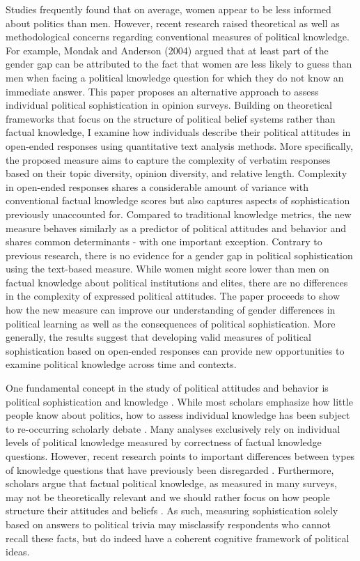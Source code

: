 \documentclass[12pt]{article}
\begin{document}
Studies frequently found that on average, women appear to be less informed about politics than men. However, recent research raised theoretical as well as methodological concerns regarding conventional measures of political knowledge. For example, Mondak and Anderson (2004) argued that at least part of the gender gap can be attributed to the fact that women are less likely to guess than men when facing a political knowledge question for which they do not know an immediate answer. This paper proposes an alternative approach to assess individual political sophistication in opinion surveys. Building on theoretical frameworks that focus on the structure of political belief systems rather than factual knowledge, I examine how individuals describe their political attitudes in open-ended responses using quantitative text analysis methods. More specifically, the proposed measure aims to capture the complexity of verbatim responses based on their topic diversity, opinion diversity, and relative length. Complexity in open-ended responses shares a considerable amount of variance with conventional factual knowledge scores but also captures aspects of sophistication previously unaccounted for. Compared to traditional knowledge metrics, the new measure behaves similarly as a predictor of political attitudes and behavior and shares common determinants - with one important exception. Contrary to previous research, there is no evidence for a gender gap in political sophistication using the text-based measure. While women might score lower than men on factual knowledge about political institutions and elites, there are no differences in the complexity of expressed political attitudes. The paper proceeds to show how the new measure can improve our understanding of gender differences in political learning as well as the consequences of political sophistication. More generally, the results suggest that developing valid measures of political sophistication based on open-ended responses can provide new opportunities to examine political knowledge across time and contexts.

One fundamental concept in the study of political attitudes and behavior is political sophistication and knowledge \citep{converse1964nature,carpini1996americans}. While most scholars emphasize how little people know about politics, how to assess individual knowledge has been subject to re-occurring scholarly debate \citep[e.g.][]{mondak2000reconsidering,mondak2001asked,sturgis2008experiment,debell2013harder,pietryka2013analysis}. Many analyses exclusively rely on individual levels of political knowledge measured by correctness of factual knowledge questions. However, recent research points to important differences between types of knowledge questions that have previously been disregarded \citep{barabas2014question}. Furthermore, scholars argue that factual political knowledge, as measured in many surveys, may not be theoretically relevant \citep{lupia2006elitism} and we should rather focus on how people structure their attitudes and beliefs \citep[e.g.][]{luskin1987measuring}. As such, measuring sophistication solely based on answers to political trivia may misclassify respondents who cannot recall these facts, but do indeed have a coherent cognitive framework of political ideas.
\end{document}
